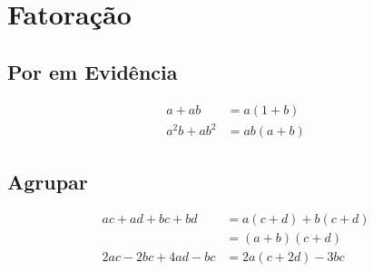 \chapter{Fatoração}

\section{Por em Evidência}

\begin{align}
    a+ab&=a(1+b)\\
    a^2b+ab^2&=ab(a+b)
\end{align}

\section{Agrupar}

\begin{align}
    ac+ad+bc+bd&=a(c+d)+b(c+d)\\
    &=(a+b)(c+d)\\
    2ac-2bc+4ad-bc&=2a(c+2d)-3bc
\end{align}

